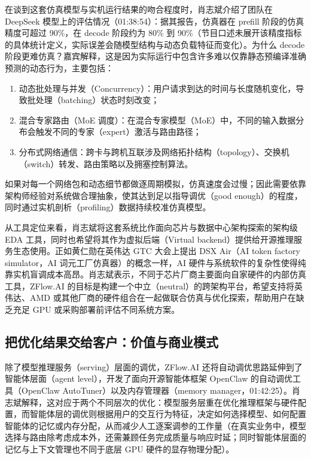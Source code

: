 \documentclass[UTF8,a4paper,11pt,fontset=fandol]{ctexart}
\begin{document}
在谈到这套仿真模型与实机运行结果的吻合程度时，肖志斌介绍了团队在 DeepSeek 模型上的评估情况（01:38:54）：据其报告，仿真器在 prefill 阶段的仿真精度可超过 90\%，在 decode 阶段约为 80\% 到 90\%（节目口述未展开该精度指标的具体统计定义，实际误差会随模型结构与动态负载特征而变化）。为什么 decode 阶段更难仿真？嘉宾解释，这是因为实际运行中包含许多难以仅靠静态预编译准确预测的动态行为，主要包括：
\begin{enumerate}
\item 动态批处理与并发（Concurrency）：用户请求到达的时间与长度随机变化，导致批处理（batching）状态时刻改变；
\item 混合专家路由（MoE 调度）：在混合专家模型（MoE）中，不同的输入数据分布会触发不同的专家（expert）激活与路由路径；
\item 分布式网络通信：跨卡与跨机互联涉及网络拓扑结构（topology）、交换机（switch）转发、路由策略以及拥塞控制算法。
\end{enumerate}
如果对每一个网络包和动态细节都做逐周期模拟，仿真速度会过慢；因此需要依靠架构师经验对系统做合理抽象，使其达到足以指导调优（good enough）的程度，同时通过实机剖析（profiling）数据持续校准仿真模型。

从工具定位来看，肖志斌将这套系统比作面向芯片与数据中心架构探索的架构级 EDA 工具，同时也希望将其作为虚拟后端（Virtual backend）提供给开源推理服务生态使用。正如黄仁勋在英伟达 GTC 大会上提出 DSX Air（AI token factory simulator，AI 词元工厂仿真器）的概念一样，AI 硬件与系统软件的复杂性使得纯靠实机盲调成本高昂。肖志斌表示，不同于芯片厂商主要面向自家硬件的内部仿真工具，ZFlow.AI 的目标是构建一个中立（neutral）的跨架构平台，希望支持将英伟达、AMD 或其他厂商的硬件组合在一起做联合仿真与优化探索，帮助用户在缺乏充足 GPU 或采购部署前评估不同系统方案。

\subsection{把优化结果交给客户：价值与商业模式}
除了模型推理服务（serving）层面的调优，ZFlow.AI 还将自动调优思路延伸到了智能体层面（agent level），开发了面向开源智能体框架 OpenClaw 的自动调优工具（OpenClaw AutoTuner）以及内存管理器（memory manager，01:42:25）。肖志斌解释，这对应于两个不同层次的优化：模型服务层重在优化推理框架与硬件配置，而智能体层的调优则根据用户的交互行为特征，决定如何选择模型、如何配置智能体的记忆或内存分配，从而减少人工逐案调参的工作量（在真实业务中，模型选择与路由除考虑成本外，还需兼顾任务完成质量与响应时延；同时智能体层面的记忆与上下文管理也不同于底层 GPU 硬件的显存物理分配）。
\end{document}
